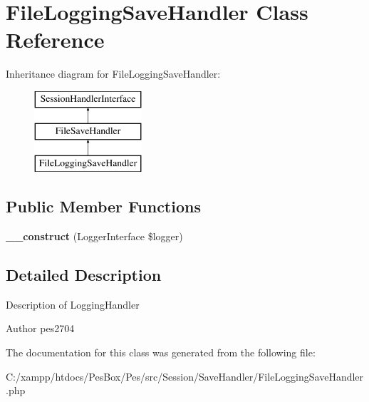 \hypertarget{class_pes_1_1_session_1_1_save_handler_1_1_file_logging_save_handler}{}\section{File\+Logging\+Save\+Handler Class Reference}
\label{class_pes_1_1_session_1_1_save_handler_1_1_file_logging_save_handler}
Inheritance diagram for File\+Logging\+Save\+Handler\+:\begin{figure}[H]
\begin{center}
\leavevmode
\includegraphics[height=3.000000cm]{class_pes_1_1_session_1_1_save_handler_1_1_file_logging_save_handler}
\end{center}
\end{figure}
\subsection*{Public Member Functions}
\begin{DoxyCompactItemize}
\item 
\mbox{\label{class_pes_1_1_session_1_1_save_handler_1_1_file_logging_save_handler_a2bd426f7ee55a596b1893454a77a006a}} 
{\bfseries \+\_\+\+\_\+construct} (Logger\+Interface \$logger)
\end{DoxyCompactItemize}


\subsection{Detailed Description}
Description of Logging\+Handler

\begin{DoxyAuthor}{Author}
pes2704 
\end{DoxyAuthor}


The documentation for this class was generated from the following file\+:\begin{DoxyCompactItemize}
\item 
C\+:/xampp/htdocs/\+Pes\+Box/\+Pes/src/\+Session/\+Save\+Handler/File\+Logging\+Save\+Handler.\+php\end{DoxyCompactItemize}
